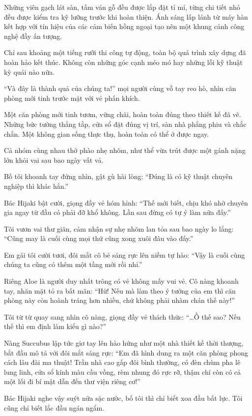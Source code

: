 \documentclass[../main.tex]{subfiles}
\begin{document}
Những viên gạch lát sàn, tấm ván gỗ đều được lắp đặt tỉ mỉ, từng chi tiết nhỏ đều được kiểm tra kỹ lưỡng trước khi hoàn thiện. Ánh sáng lấp lánh từ máy hàn kết hợp với tín hiệu của các cảm biến hồng ngoại tạo nên một khung cảnh công nghệ đầy ấn tượng.

Chỉ sau khoảng một tiếng rưỡi thi công tự động, toàn bộ quá trình xây dựng đã hoàn hảo kết thúc. Không còn những góc cạnh méo mó hay những lỗi kỹ thuật kỳ quái nào nữa.

``Và đây là thành quả của chúng ta!'' mọi người cùng vỗ tay reo hò, nhìn căn phòng mới tinh trước mặt với vẻ phấn khích.

Một căn phòng mới tinh tươm, vững chãi, hoàn toàn đúng theo thiết kế đã vẽ. Những bức tường thẳng tắp, cửa sổ đặt đúng vị trí, sàn nhà phẳng phiu và chắc chắn. Một không gian sống thực thụ, hoàn toàn có thể ở được ngay.

Cả nhóm cùng nhau thở phào nhẹ nhõm, như thể vừa trút được một gánh nặng lớn khỏi vai sau bao ngày vất vả.

Bố tôi khoanh tay đứng nhìn, gật gù hài lòng: ``Đúng là có kỹ thuật chuyên nghiệp thì khác hẳn.''

Bác Hijaki bật cười, giọng đầy vẻ hóm hỉnh: ``Thế mới biết, chịu khó nhờ chuyên gia ngay từ đầu có phải đỡ khổ không. Lần sau đừng có tự ý làm nữa đấy.''

Tôi vươn vai thư giãn, cảm nhận sự nhẹ nhõm lan tỏa sau bao ngày lo lắng: ``Cũng may là cuối cùng mọi thứ cũng xong xuôi đâu vào đấy.''

Em gái tôi cười tươi, đôi mắt cô bé sáng rực lên niềm tự hào: ``Vậy là cuối cùng chúng ta cũng có thêm một tầng mới rồi nhỉ.''

Riêng Aloe là người duy nhất trông có vẻ không mấy vui vẻ. Cô nàng khoanh tay, nhăn mặt tỏ ra bất mãn: ``Hừ! Nếu mà làm theo ý tưởng của em thì căn phòng này còn hoành tráng hơn nhiều, chứ không phải nhàm chán thế này!''

Tôi từ từ quay sang nhìn cô nàng, giọng đầy vẻ thách thức: ``\dots Ồ thế sao? Nếu thế thì em định làm kiểu gì nào?''

Nàng Succubus lập tức giơ tay lên hào hứng như một nhà thiết kế thời thượng, bắt đầu mô tả với đôi mắt sáng rực: ``Em đã hình dung ra một căn phòng phong cách lâu đài ma thuật! Trần nhà cao gấp đôi bình thường, có đèn chùm pha lê lung linh, cửa sổ kính màu cầu vồng, rèm nhung đỏ rực rỡ, thậm chí còn có cả một lối đi bí mật dẫn đến thư viện riêng cơ!''

Bác Hijaki nghe vậy suýt nữa sặc nước, bố tôi thì chỉ biết xoa đầu bất lực. Tôi cũng chỉ biết lắc đầu ngán ngẩm.
\end{document}
